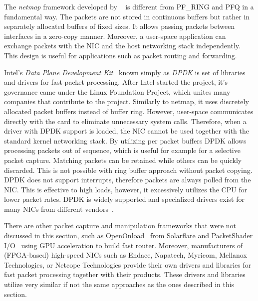 The \emph{netmap} framework developed by ~\citeauthor{Rizzo-2012-Netmap} is different from PF\_RING and PFQ in a fundamental way. The packets are not stored in continuous buffers but rather in separately allocated buffers of fixed sizes. It allows passing packets between interfaces in a zero-copy manner. Moreover, a user-space application can exchange packets with the NIC and the host networking stack independently. This design is useful for applications such as packet routing and forwarding.

Intel's \emph{Data Plane Development Kit}~\cite{LFP--Data} known simply as \emph{DPDK} is set of libraries and drivers for fast packet processing. After Intel started the project, it's governance came under the Linux Foundation Project, which unites many companies that contribute to the project. Similarly to netmap, it uses discretely allocated packet buffers instead of buffer ring. However, user-space communicates directly with the card to eliminate unnecessary system calls. Therefore, when a driver with DPDK support is loaded, the NIC cannot be used together with the standard kernel networking stack. By utilizing per packet buffers DPDK allows processing packets out of sequence, which is useful for example for a selective packet capture. Matching packets can be retained while others can be quickly discarded. This is not possible with ring buffer approach without packet copying. DPDK does not support interrupts, therefore packets are always polled from the NIC. This is effective to high loads, however, it excessively utilizes the CPU for lower packet rates. DPDK is widely supported and specialized drivers exist for many NICs from different vendors~\cite{LFP--DPDK}. 

There are other packet capture and manipulation frameworks that were not discussed in this section, such as OpenOnload~\cite{Mansley-2008-Getting} from Solarflare and PacketShader I/O~\cite{Han-2010-PacketShader} using GPU acceleration to build fast router. Moreover, manufacturers of (FPGA-based) high-speed NICs such as Endace, Napatech, Myricom, Mellanox Technologies, or Netcope Technologies provide their own drivers and libraries for fast packet processing together with their products. These drivers and libraries utilize very similar if not the same approaches as the ones described in this section.

